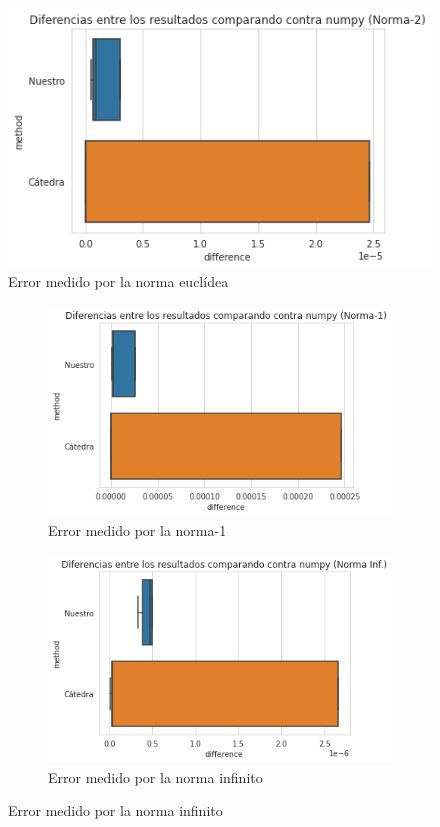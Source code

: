 \documentclass[a4paper]{article}
\begin{document}
\begin{figure}[H]
    \begin{center}
        \includegraphics[scale=0.75]{img/prec/n2.png}
        \caption{Error medido por la norma euclídea}
        \label{prec-norma2}
    \end{center}
\end{figure}

\begin{figure}[H]
    \begin{subfigure}{.5\textwidth}
        \centering
        \includegraphics[scale=0.5]{img/prec/n1.png}
        \caption{Error medido por la norma-1}
        \label{prec-norma1}
    \end{subfigure}
    \begin{subfigure}{.5\textwidth}
        \centering
        \includegraphics[scale=0.5]{img/prec/index.png}
        \caption{Error medido por la norma infinito}
        \label{prec-normainf}
    \end{subfigure}
\end{figure}
\end{document}
